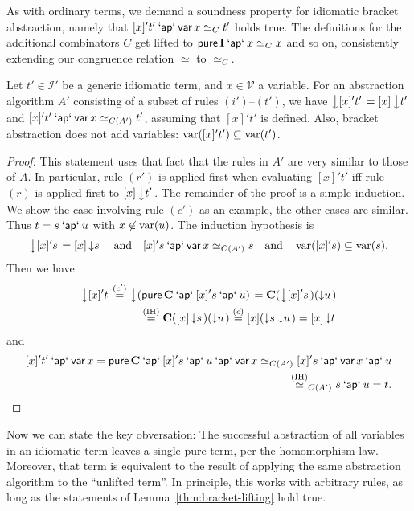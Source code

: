 As with ordinary terms, we demand a soundness property for idiomatic bracket
abstraction, namely that $[x]'t' \mathbin{\mathsf{`ap`}} \operatorname{\mathsf{var}} x \simeq_C t'$ holds true.
The definitions for the additional combinators $C$ get lifted to
$\operatorname{\mathsf{pure}} \mathbf{I} \mathbin{\mathsf{`ap`}} x \simeq_C x$ and so on, consistently extending our
congruence relation $\simeq$ to $\simeq_C$.

\begin{lemma}\label{thm:bracket-lifting}
Let $t' \in \mathcal{I'}$ be a generic idiomatic term, and $x \in \mathcal{V}$
a variable.
For an abstraction algorithm $A'$ consisting of a subset of rules $(i')$--$(t')$,
we have $\left\downarrow [x]'t'\right. = [x]\left\downarrow t'\right.$ and $[x]'t' \mathbin{\mathsf{`ap`}} \operatorname{\mathsf{var}} x \simeq_{C(A')} t'$,
assuming that $[x]'t'$ is defined.
Also, bracket abstraction does not add variables:
$\operatorname{var}([x]'t') \subseteq \operatorname{var}(t')$.
\end{lemma}
\begin{proof}
This statement uses that fact that the rules in $A'$ are very similar to those
of $A$.
In particular, rule $(r')$ is applied first when evaluating $[x]'t'$ iff rule
$(r)$ is applied first to $[x]\left\downarrow t'\right.$.
The remainder of the proof is a simple induction.
We show the case involving rule $(c')$ as an example, the other cases are similar.
Thus $t = s \mathbin{\mathsf{`ap`}} u$ with $x \not\in \operatorname{var}(u)$.
The induction hypothesis is
\[ \left\downarrow [x]'s\right. = [x]\left\downarrow s\right. \quad\text{and}\quad [x]'s \mathbin{\mathsf{`ap`}} \operatorname{\mathsf{var}} x \simeq_{C(A')} s
	\quad\text{and}\quad \operatorname{var}([x]'s) \subseteq \operatorname{var}(s). \]
Then we have
\[\begin{split}
	\left\downarrow [x]'t\right. \stackrel{(c')}{=} \left\downarrow (\operatorname{\mathsf{pure}} \mathbf{C} \mathbin{\mathsf{`ap`}} [x]'s \mathbin{\mathsf{`ap`}} u)\right.
	= \mathbf{C} (\left\downarrow [x]'s\right.) (\left\downarrow u\right.) \\
	\stackrel{\text{(IH)}}{=} \mathbf{C} ([x]\left\downarrow s\right.) (\left\downarrow u\right.)
	\stackrel{(c)}{=} [x](\left\downarrow s\right. \left\downarrow u\right.)
	= [x]\left\downarrow t\right. \end{split}\]
and
\[\begin{split} [x]'t' \mathbin{\mathsf{`ap`}} \operatorname{\mathsf{var}} x = \operatorname{\mathsf{pure}} \mathbf{C} \mathbin{\mathsf{`ap`}} [x]'s \mathbin{\mathsf{`ap`}} u \mathbin{\mathsf{`ap`}} \operatorname{\mathsf{var}} x
	\simeq_{C(A')} [x]'s \mathbin{\mathsf{`ap`}} \operatorname{\mathsf{var}} x \mathbin{\mathsf{`ap`}} u \\
	\stackrel{\text{(IH)}}{\simeq}_{C(A')} s \mathbin{\mathsf{`ap`}} u = t. \end{split}\]
\end{proof}

Now we can state the key obversation:
The successful abstraction of all variables in an idiomatic term leaves a
single pure term, per the homomorphism law.
Moreover, that term is equivalent to the result of applying the same abstraction
algorithm to the ``unlifted term''.
In principle, this works with arbitrary rules, as long as the statements of
Lemma~\ref{thm:bracket-lifting} hold true.

